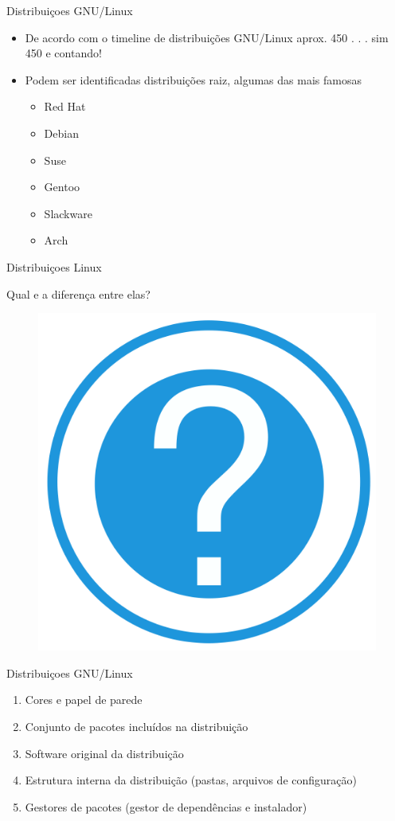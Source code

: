 \documentclass{beamer}
\begin{document}
\begin{frame}{Distribuiçoes GNU/Linux}
\begin{itemize}
\item De acordo com o timeline de distribuições GNU/Linux \cite{GDT2012} aprox. 450 . . . sim 450 e contando!
\item Podem ser identificadas distribuições raiz, algumas das mais famosas \cite{YoLinux012}
\begin{itemize}
\item Red Hat
\item Debian
\item Suse
\item Gentoo
\item Slackware
\item Arch
\end{itemize}
\end{itemize}
\end{frame}

\begin{frame}{Distribuiçoes Linux}
\begin{center}
Qual e a diferença entre elas?
\end{center}
\begin{figure}[tbph]
\centering
\includegraphics[width=0.3\linewidth]{./question}
\label{fig:question2}
\end{figure}
\end{frame}

\begin{frame}{Distribuiçoes GNU/Linux}
\begin{enumerate}
\item Cores e papel de parede
\item Conjunto de pacotes incluídos na distribuição
\item Software original da distribuição
\item Estrutura interna da distribuição (pastas, arquivos de configuração)
\item Gestores de pacotes (gestor de dependências e instalador)
\end{enumerate}
\end{frame}
\end{document}
